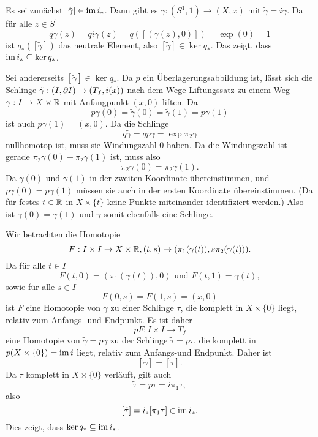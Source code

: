\documentclass[a4paper,10pt]{article}
\begin{document}
Es sei zunächst $[\tilde{\gamma}] \in \operatorname{im} i_*$. Dann gibt es $\gamma : (S^1, 1) \to (X,x)$ mit $\tilde{\gamma} = i \gamma$. Da für alle $z \in S^1$
\[
 q \tilde{\gamma}(z)
 = q i \gamma(z)
 = q ([(\gamma(z),0)])
 = \exp(0)
 = 1
\]
ist $q_*([\tilde{\gamma}])$ das neutrale Element, also $[\tilde{\gamma}] \in \ker q_*$. Das zeigt, dass $\operatorname{im} i_* \subseteq \ker q_*$.

Sei andererseits $[\tilde{\gamma}] \in \ker q_*$. Da $p$ ein Überlagerungsabbildung ist, lässt sich die Schlinge $\tilde{\gamma} : (I,\partial I) \to (T_f,i(x))$ nach dem Wege-Liftungssatz zu einem Weg $\gamma : I \to X \times \mathbb{R}$ mit Anfangpunkt $(x,0)$ liften. Da
\[
 p \gamma(0) = \tilde{\gamma}(0) = \tilde{\gamma}(1) = p \gamma (1)
\]
ist auch $p \gamma(1) = (x,0)$. Da die Schlinge
\[
 q \tilde{\gamma}
 = q p \gamma
 = \exp \pi_2 \gamma
\]
nullhomotop ist, muss sie Windungszahl $0$ haben. Da die Windungszahl ist gerade $\pi_2 \gamma(0) - \pi_2 \gamma(1)$ ist, muss also
\[
 \pi_2 \gamma(0) = \pi_2 \gamma(1).
\]
Da $\gamma(0)$ und $\gamma(1)$ in der zweiten Koordinate übereinstimmen, und $p \gamma(0) = p \gamma(1)$ müssen sie auch in der ersten Koordinate übereinstimmen. (Da für festes $t \in \mathbb{R}$ in $X \times \{t\}$ keine Punkte miteinander identifiziert werden.) Also ist $\gamma(0) = \gamma(1)$ und $\gamma$ somit ebenfalls eine Schlinge.

Wir betrachten die Homotopie
\[
 F : I \times I \to X \times \mathbb{R}, (t,s) \mapsto ( \pi_1(\gamma(t)), s \pi_2(\gamma(t)) ).
\]
Da für alle $t \in I$
\[
 F(t,0) = (\pi_1(\gamma(t)),0) \text{ und }
 F(t,1) = \gamma(t),
\]
sowie für alle $s \in I$
\[
 F(0,s) = F(1,s) = (x,0)
\]
ist $F$ eine Homotopie von $\gamma$ zu einer Schlinge $\tau$, die komplett in $X \times \{0\}$ liegt, relativ zum Anfangs- und Endpunkt. Es ist daher
\[
 p F : I \times I \to T_f
\]
eine Homotopie von $\tilde{\gamma} = p \gamma$ zu der Schlinge $\tilde{\tau} = p \tau$, die komplett in $p(X \times \{0\}) = \operatorname{im} i$ liegt, relativ zum Anfangs-und Endpunkt. Daher ist
\[
 [\tilde{\gamma}] = [\tilde{\tau}].
\]
Da $\tau$ komplett in $X \times \{0\}$ verläuft, gilt auch
\[
 \tilde{\tau} = p \tau = i \pi_1 \tau,
\]
also
\[
 [\tilde{\tau}] = i_* [\pi_1 \tau] \in \operatorname{im} i_*.
\]
Dies zeigt, dass $\ker q_* \subseteq \operatorname{im} i_*$.
\end{document}
